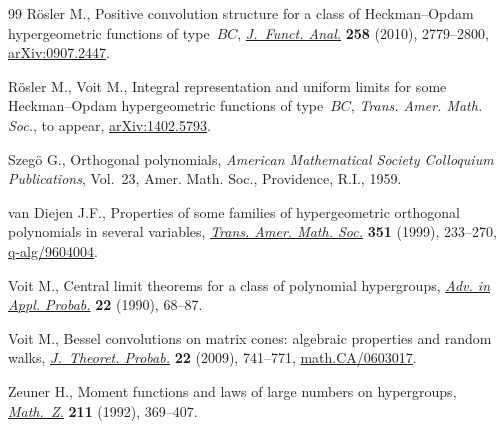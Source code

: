 \documentclass[11pt]{article}
\numberwithin{equation}{section}
\begin{document}
\begin{thebibliography}{99}
R{\"o}sler M., Positive convolution structure for a class of {H}eckman--{O}pdam
  hypergeometric functions of type~{$BC$}, \href{http://dx.doi.org/10.1016/j.jfa.2009.12.007}{\textit{J.~Funct. Anal.}}
  \textbf{258} (2010), 2779--2800, \href{http://arxiv.org/abs/0907.2447}{arXiv:0907.2447}.

R\"osler M., Voit M., Integral representation and uniform limits for some
  Heckman--Opdam hypergeometric functions of type~$BC$, \textit{Trans. Amer.
  Math. Soc.}, {t}o appear, \href{http://arxiv.org/abs/1402.5793}{arXiv:1402.5793}.

Szeg{\"o} G., Orthogonal polynomials, \textit{American Mathematical Society
  Colloquium Publications}, Vol.~23, Amer. Math. Soc., Providence, R.I., 1959.

van Diejen J.F., Properties of some families of hypergeometric orthogonal
  polynomials in several variables, \href{http://dx.doi.org/10.1090/S0002-9947-99-02000-0}{\textit{Trans. Amer. Math. Soc.}}
  \textbf{351} (1999), 233--270, \href{http://arxiv.org/abs/q-alg/9604004}{q-alg/9604004}.

Voit M., Central limit theorems for a class of polynomial hypergroups,
  \href{http://dx.doi.org/10.2307/1427597}{\textit{Adv. in Appl. Probab.}} \textbf{22} (1990), 68--87.

Voit M., Bessel convolutions on matrix cones: algebraic properties and random
  walks, \href{http://dx.doi.org/10.1007/s10959-008-0186-2}{\textit{J.~Theoret. Probab.}} \textbf{22} (2009), 741--771,
  \href{http://arxiv.org/abs/math.CA/0603017}{math.CA/0603017}.

Zeuner H., Moment functions and laws of large numbers on hypergroups,
  \href{http://dx.doi.org/10.1007/BF02571436}{\textit{Math.~Z.}} \textbf{211} (1992), 369--407.

\end{thebibliography}
\end{document}
